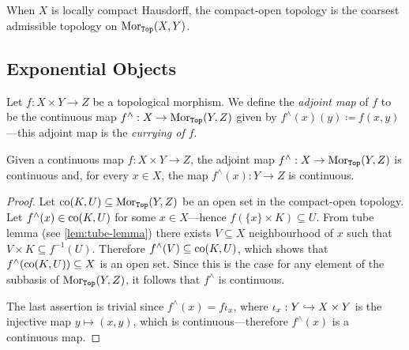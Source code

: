 \begin{corollary}
\label{cor:cpct-open-is-coarsest-admissible}
When \(X\) is locally compact Hausdorff, the compact-open topology is the
coarsest admissible topology on \(\operatorname{Mor}_{{\texttt{Top}}}(X, Y)\).
\end{corollary}

\subsection{Exponential Objects}

\begin{definition}
\label{def:adjoint-map-top}
Let \(f: X \times Y \to Z\) be a topological morphism. We define the
\emph{adjoint map} of \(f\) to be the continuous map \(f^{\wedge}: X \to
\operatorname{Mor}_{{\texttt{Top}}}(Y, Z)\) given by \(f^{\wedge}(x)(y) \coloneq f(x, y)\)---this
adjoint map is the \emph{currying of \(f\)}.
\end{definition}

\begin{proposition}
\label{prop:adjoint-map-is-continuous}
Given a continuous map \(f: X \times Y \to Z\), the adjoint map
\(f^{\wedge}: X \to \operatorname{Mor}_{{\texttt{Top}}}(Y, Z)\) is continuous and, for every
\(x \in X\), the map \(f^{\wedge}(x): Y \to Z\) is continuous.
\end{proposition}

\begin{proof}
Let \(\operatorname{co}(K, U) \subseteq \operatorname{Mor}_{{\texttt{Top}}}(Y, Z)\) be an open set in the compact-open
topology. Let \(f^{\wedge}(x) \in \operatorname{co}(K, U)\) for some \(x \in X\)---hence
\(f(\{x\} \times K) \subseteq U\). From tube lemma (see \cref{lem:tube-lemma})
there exists \(V \subseteq X\) neighbourhood of \(x\) such that \(V \times K
\subseteq f^{-1}(U)\). Therefore \(f^{\wedge}(V) \subseteq \operatorname{co}(K, U)\), which
shows that \(f^{\wedge}(\operatorname{co}(K, U)) \subseteq X\) is an open set. Since this is the
case for any element of the subbasis of \(\operatorname{Mor}_{{\texttt{Top}}}(Y, Z)\), it follows that
\(f^{\wedge}\) is continuous.

The last assertion is trivial since \(f^{\wedge}(x) = f \iota_x\), where
\(\iota_x: Y \hookrightarrow X \times Y\) is the injective map \(y \mapsto (x, y)\), which
is continuous---therefore \(f^{\wedge}(x)\) is a continuous map.
\end{proof}

